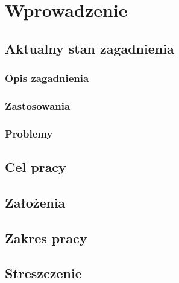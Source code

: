 \chapter{Wprowadzenie}
\label{t:wprowadzenie}


	\section{Aktualny stan zagadnienia}
	\label{t:wprowadzenie:stan}
	
		\subsection{Opis zagadnienia}
		\label{t:wprowadzenie:stan:opis}
		
		\subsection{Zastosowania}
		\label{t:wprowadzenie:stan:zastosowania}
		
		\subsection{Problemy}
		\label{t:wprowadzenie:stan:problemy}
		
		
	\section{Cel pracy}
	\label{t:wprowadzenie:cel}
	
	\section{Założenia}
	\label{t:wprowadzenie:zalozenia}
	
	\section{Zakres pracy}
	\label{t:wprowadzenie:zakres}
	
	
	\section{Streszczenie}
	\label{t:wprowadzenie:streszczenie}